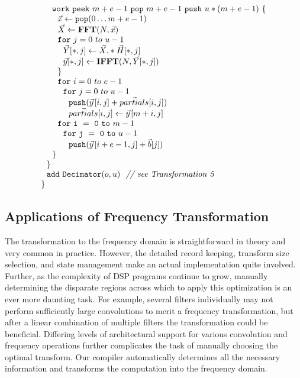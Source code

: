 \begin{transformation}
\begin{equation}
\begin{array}{ll}
    \\
    ~~~~{\tt work}~{\tt peek}~m+e-1~{\tt pop}~m+e-1~{\tt push}~u*(m+e-1)~{\tt \{} \\
    ~~~~~~\vec{x} \leftarrow {\tt pop}(0 \dots m+e-1) \\
    ~~~~~~\vec{X} \leftarrow \mathbf{FFT} (N, \vec{x}) \\
    ~~~~~~{\tt for}~j=0~to~u-1\\
    ~~~~~~~~\vec{Y}[*,j] \leftarrow \vec{X} .* \vec{H}[*,j] \\
    ~~~~~~~~\vec{y}[*,j] \leftarrow \mathbf{IFFT}(N, \vec{Y}[*,j]) \\
    ~~~~~~{\tt \}} \\
    ~~~~~~{\tt for}~i=0~to~e-1\\
    ~~~~~~~~{\tt for}~j=0~to~u-1\\
    ~~~~~~~~~~{\tt push}(\vec{y}\hspace{1pt}[i,j] + \vec{partials}[i,j])\\
    ~~~~~~~~~~\vec{partials}[i,j] \leftarrow \vec{y}\hspace{1pt}[m+i,j]\\
    ~~~~~~{\tt for~i~=~0~to~}m-1\\
    ~~~~~~~~{\tt for~j~=~0~to~}u-1\\
    ~~~~~~~~~~{\tt push}(\vec{y}\hspace{1pt}[i+e-1,j] + {\vec b}[j])\\
    ~~~~{\tt \}} \\
    ~~{\tt \}} \\
    ~~{\tt add~Decimator}(o, u)~~\mbox{\it // see Transformation 5}\\
    {\tt \}} \\
  \end{array}
\end{equation}
\label{trans:freq1}
\end{transformation}

\subsection{Applications of Frequency Transformation}

The transformation to the frequency domain is straightforward in
theory and very common in practice. However, the detailed record
keeping, transform size selection, and state management make an actual
implementation quite involved.  Further, as the complexity of DSP
programs continue to grow, manually determining the disparate regions
across which to apply this optimization is an ever more daunting task.
For example, several filters individually may not perform sufficiently
large convolutions to merit a frequency transformation, but after a
linear combination of multiple filters the transformation could be
beneficial.  Differing levels of architectural support for various
convolution and frequency operations further complicates the task of
manually choosing the optimal transform.  Our compiler automatically
determines all the necessary information and transforms the
computation into the frequency domain.

